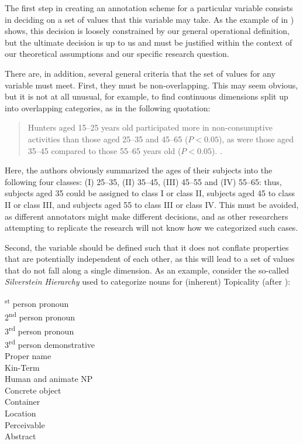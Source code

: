 The first step in creating an annotation  scheme for a particular variable consists in deciding on a set of values that this variable may take. As the example of   in ) shows, this decision is loosely constrained by our general operational  definition, but the ultimate decision is up to us and must be justified within the context of our theoretical assumptions and our specific research question.

There are, in addition, several general criteria that the set of values for any variable must meet. First, they must be non\hyp{}overlapping. This may seem obvious, but it is not at all unusual, for example, to find continuous dimensions split up into overlapping categories,  as in the following quotation:

\begin{quote}
Hunters aged 15--25 years old participated more in non\hyp{}consumptive activities than those aged 25--35 and 45--65 ($P<0.05$), as were those aged 35--45 compared to those 55--65 years old ($P<0.05$). \citep[304]{ericsson_jagare_2002}.
\end{quote}

Here, the authors obviously summarized the ages of their subjects into the following four classes: (I) 25--35, (II) 35--45, (III) 45--55 and (IV) 55--65: thus, subjects aged 35 could be assigned to class I or class II, subjects aged 45 to class II or class III, and subjects aged 55 to class III or class IV. This must be avoided, as different annotators  might make different decisions, and as other researchers attempting to replicate  the research will not know how we categorized  such cases.

Second, the variable should be defined such that it does not conflate properties that are potentially independent of each other, as this will lead to a set of values that do not fall along a single dimension. As an example, consider the so\hyp{}called \textit{Silverstein Hierarchy}  used to categorize  nouns  for (inherent) Topicality  (after \citealt[67]{deane_english_1987}):

\begin{exe}
\textsuperscript{st} person pronoun\\
2\textsuperscript{nd} person pronoun\\
3\textsuperscript{rd} person pronoun\\
3\textsuperscript{rd} person demonstrative\\
Proper name\\
Kin\hyp{}Term\\
Human and animate NP\\
Concrete object\\
Container\\
Location\\
Perceivable\\
Abstract
\label{ex:silverstein}
\end{exe}


